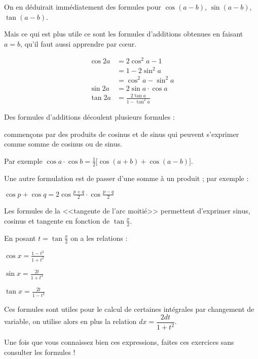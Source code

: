 On en déduirait immédiatement des formules pour $\cos(a-b)$, $\sin(a-b)$,
$\tan(a-b)$.

\change

Mais ce qui est plus utile ce sont les formules d'additions
obtenues en faisant $a=b$, qu'il faut aussi apprendre par c\oe ur.

\begin{align*}
\cos 2a &= 2\cos^2a-1\\
    &= 1-2\sin^2a\\
    &=\cos^2a-\sin^2a\\
\sin 2a &= 2\sin a\cdot \cos a\\
\tan 2a &= \frac{2\tan a}{1-\tan^2 a}
\end{align*}  


\diapo

Des formules d'additions découlent plusieurs formules :

commençons par des produits de cosinus et de sinus qui peuvent s'exprimer
comme somme de cosinus ou de sinus.

Par exemple $\cos a\cdot\cos b = \frac{1}{2}\big[ \cos(a+b)+\cos(a-b)\big]$.

\change

Une autre formulation est de passer d'une somme à un produit ;
par exemple :

$\cos p+\cos q = 2\cos \frac{p+q}{2}\cdot\cos\frac{p-q}{2}$

\diapo

Les formules de la <<tangente de l'arc moitié>> permettent d'exprimer sinus, cosinus et tangente
en fonction de $\tan \frac x2$.

En posant $t=\tan \frac{x}{2}$ on a les relations :

$\cos x = \frac {1-t^2}{1+t^2}$

$\sin x = \frac{2t}{1+t^2}$
    
$\tan x = \frac{2t}{1-t^2}$

Ces formules sont utiles pour le calcul de certaines intégrales par changement de variable, 
on utilise alors en plus la relation $dx=\dfrac{2dt}{1+t^2}$.

\diapo

Une fois que vous connaissez bien ces expressions, faites ces exercices sans
consulter les formules !

